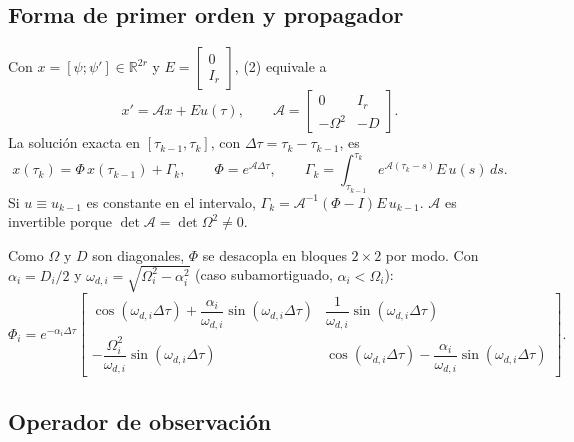 \subsection{Forma de primer orden y propagador}

Con $x=[\psi;\psi']\in\mathbb R^{2r}$ y $E=\begin{bmatrix}0\\ I_r\end{bmatrix}$, (2) equivale a
\[
x'=\mathcal Ax+Eu(\tau),\qquad
\mathcal A=\begin{bmatrix}0&I_r\\-\Omega^2&-D\end{bmatrix}.
\]
La solución exacta en $[\tau_{k-1},\tau_k]$, con $\Delta\tau=\tau_k-\tau_{k-1}$, es
\[
x(\tau_k)=\Phi\,x(\tau_{k-1})+\Gamma_k,\qquad
\Phi=e^{\mathcal A\Delta\tau},\qquad
\Gamma_k=\int_{\tau_{k-1}}^{\tau_k}e^{\mathcal A(\tau_k-s)}E\,u(s)\,ds.
\]
Si $u\equiv u_{k-1}$ es constante en el intervalo, $\Gamma_k=\mathcal A^{-1}(\Phi-I)E\,u_{k-1}$. $\mathcal A$ es invertible porque $\det\mathcal A=\det\Omega^2\neq0$.

Como $\Omega$ y $D$ son diagonales, $\Phi$ se desacopla en bloques $2\times2$ por modo. Con $\alpha_i=D_i/2$ y $\omega_{d,i}=\sqrt{\Omega_i^2-\alpha_i^2}$ (caso subamortiguado, $\alpha_i<\Omega_i$):
\[
\Phi_i=e^{-\alpha_i\Delta\tau}
\begin{bmatrix}
\cos(\omega_{d,i}\Delta\tau)+\dfrac{\alpha_i}{\omega_{d,i}}\sin(\omega_{d,i}\Delta\tau) & \dfrac{1}{\omega_{d,i}}\sin(\omega_{d,i}\Delta\tau)\\[8pt]
-\dfrac{\Omega_i^2}{\omega_{d,i}}\sin(\omega_{d,i}\Delta\tau) & \cos(\omega_{d,i}\Delta\tau)-\dfrac{\alpha_i}{\omega_{d,i}}\sin(\omega_{d,i}\Delta\tau)
\end{bmatrix}.
\]

\subsection{Operador de observación}

